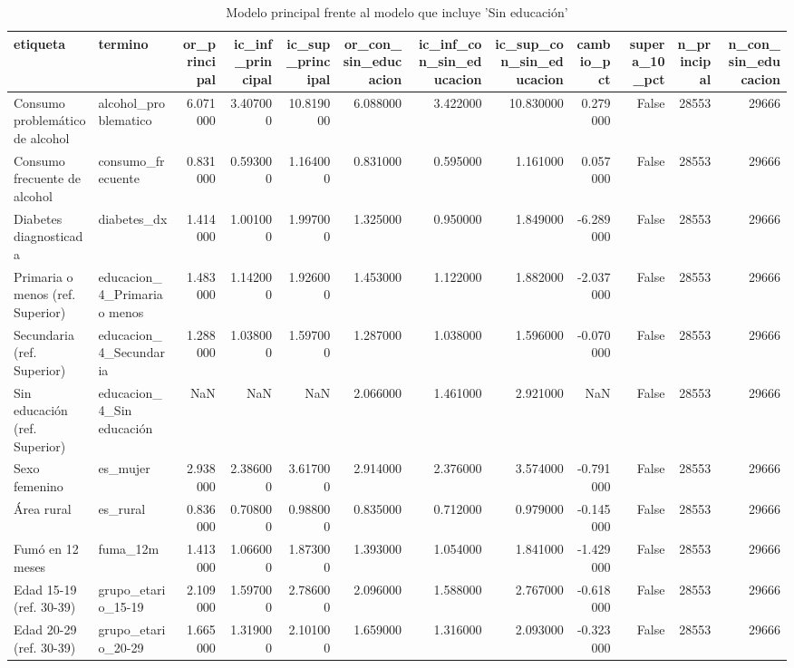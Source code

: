 \begin{table}[htbp]
\caption{Modelo principal frente al modelo que incluye 'Sin educación'}
\label{tab:tabla_64_modelo_con_sin_educacion}
\begin{tabular}{llrrrrrrrrrr}
\toprule
etiqueta & termino & or\_principal & ic\_inf\_principal & ic\_sup\_principal & or\_con\_sin\_educacion & ic\_inf\_con\_sin\_educacion & ic\_sup\_con\_sin\_educacion & cambio\_pct & supera\_10\_pct & n\_principal & n\_con\_sin\_educacion \\
\midrule
Consumo problemático de alcohol & alcohol\_problematico & 6.071000 & 3.407000 & 10.819000 & 6.088000 & 3.422000 & 10.830000 & 0.279000 & False & 28553 & 29666 \\
Consumo frecuente de alcohol & consumo\_frecuente & 0.831000 & 0.593000 & 1.164000 & 0.831000 & 0.595000 & 1.161000 & 0.057000 & False & 28553 & 29666 \\
Diabetes diagnosticada & diabetes\_dx & 1.414000 & 1.001000 & 1.997000 & 1.325000 & 0.950000 & 1.849000 & -6.289000 & False & 28553 & 29666 \\
Primaria o menos (ref. Superior) & educacion\_4\_Primaria o menos & 1.483000 & 1.142000 & 1.926000 & 1.453000 & 1.122000 & 1.882000 & -2.037000 & False & 28553 & 29666 \\
Secundaria (ref. Superior) & educacion\_4\_Secundaria & 1.288000 & 1.038000 & 1.597000 & 1.287000 & 1.038000 & 1.596000 & -0.070000 & False & 28553 & 29666 \\
Sin educación (ref. Superior) & educacion\_4\_Sin educación & NaN & NaN & NaN & 2.066000 & 1.461000 & 2.921000 & NaN & False & 28553 & 29666 \\
Sexo femenino & es\_mujer & 2.938000 & 2.386000 & 3.617000 & 2.914000 & 2.376000 & 3.574000 & -0.791000 & False & 28553 & 29666 \\
Área rural & es\_rural & 0.836000 & 0.708000 & 0.988000 & 0.835000 & 0.712000 & 0.979000 & -0.145000 & False & 28553 & 29666 \\
Fumó en 12 meses & fuma\_12m & 1.413000 & 1.066000 & 1.873000 & 1.393000 & 1.054000 & 1.841000 & -1.429000 & False & 28553 & 29666 \\
Edad 15-19 (ref. 30-39) & grupo\_etario\_15-19 & 2.109000 & 1.597000 & 2.786000 & 2.096000 & 1.588000 & 2.767000 & -0.618000 & False & 28553 & 29666 \\
Edad 20-29 (ref. 30-39) & grupo\_etario\_20-29 & 1.665000 & 1.319000 & 2.101000 & 1.659000 & 1.316000 & 2.093000 & -0.323000 & False & 28553 & 29666 \\

\end{tabular}
\end{table}
